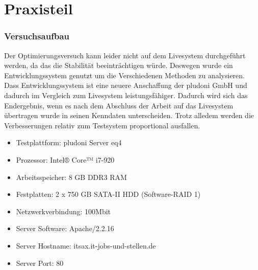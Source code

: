 \part{Praxisteil}

\section{Versuchsaufbau}
Der Optimierungsversuch kann leider nicht auf dem Livesystem durchgeführt werden, da das die Stabilität beeinträchtigen würde. Deswegen wurde ein Entwicklungssystem genutzt um die Verschiedenen Methoden zu analysieren. Dass Entwicklungssystem ist eine neuere Anschaffung der pludoni GmbH und dadurch im Vergleich zum Livesystem leistungsfähiger. Dadurch wird sich das Endergebnis, wenn es nach dem Abschluss der Arbeit auf das Livesystem übertragen wurde in seinen Kenndaten unterscheiden. Trotz alledem werden die Verbesserungen relativ zum Testsystem proportional ausfallen. 

\begin{itemize}
 \item Testplattform: pludoni Server eq4
  \item Prozessor: Intel® Core™ i7-920
  \item Arbeitsspeicher: 8 GB DDR3 RAM
  \item Festplatten: 2 x 750 GB SATA-II HDD (Software-RAID 1)
  \item Netzwerkverbindung: 100Mbit
  \item Server Software: Apache/2.2.16
  \item Server Hostname: itsax.it-jobs-und-stellen.de
  \item Server Port: 80
\end{itemize}

